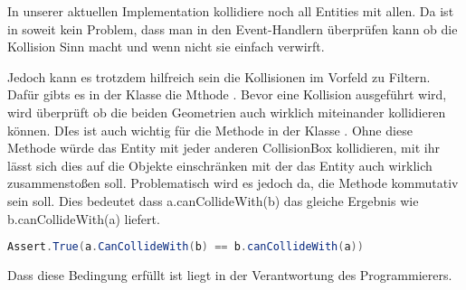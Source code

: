 In unserer aktuellen Implementation kollidiere noch all Entities mit allen. Da ist in soweit kein Problem, dass man in den Event-Handlern überprüfen kann ob die Kollision Sinn macht und wenn nicht sie einfach verwirft.

Jedoch kann es trotzdem hilfreich sein die Kollisionen im Vorfeld zu Filtern. Dafür gibts es in der Klasse  die Mthode . Bevor eine Kollision ausgeführt wird, wird überprüft ob die beiden Geometrien auch wirklich miteinander kollidieren können. DIes ist auch wichtig für die  Methode in der Klasse . Ohne diese Methode würde das Entity mit jeder anderen CollisionBox kollidieren, mit ihr lässt sich dies auf die Objekte einschränken mit der das Entity auch wirklich zusammenstoßen soll.
Problematisch wird es jedoch da, die Methode kommutativ sein soll.
Dies bedeutet dass a.canCollideWith(b) das gleiche Ergebnis wie b.canCollideWith(a) liefert. 

\doinline
\begin{lstlisting}[caption=Kommutative Eigenschaft von canCollideWith, title=\hspace{0 pt}, language=java]
Assert.True(a.CanCollideWith(b) == b.canCollideWith(a))
\end{lstlisting}

Dass diese Bedingung erfüllt ist liegt in der Verantwortung des Programmierers.